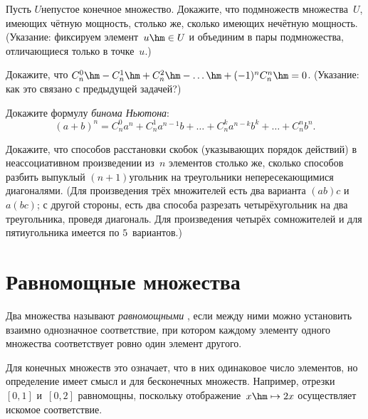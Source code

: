 \begin{problem}
Пусть $U$\т непустое конечное множество. Докажите, что
подмножеств множества~$U$, имеющих чётную мощность, столько же,
сколько имеющих нечётную мощность. (Указание: фиксируем
элемент~$u\hm\in U$ и объединим в пары подмножества, отличающиеся только
в точке~$u$.)
\end{problem}

\begin{problem}
Докажите, что $C_n^0\hm-C_n^1\hm+C_n^2\hm-\ldots\hm+(-1)^nC_n^n\hm=0$.
(Указание: как это связано с предыдущей задачей?)
\end{problem}

\begin{problem}
Докажите формулу \emph{бинома Ньютона}:
        $$
(a+b)^n= C_n^0 a^n + C_n^1 a^{n-1}b +
    \ldots+C_n^k a^{n-k}b^{k}+\ldots+C_n^n b^n.
        $$
\end{problem}

\begin{problem}
Докажите, что способов расстановки скобок (указывающих порядок
действий) в неассоциативном произведении из~$n$ элементов
столько же, сколько способов разбить выпуклый
$(n+1)$\д угольник на треугольники непересекающимися диагоналями.
(Для произведения трёх множителей есть два варианта $(ab)c$ и
$a(bc)$; с другой стороны, есть два способа разрезать
четырёхугольник на два треугольника, проведя диагональ. Для
произведения четырёх сомножителей и для пятиугольника имеется по
$5$~вариантов.)
\end{problem}

\section{Равномощные множества}
        \label{same-cardinality}

Два множества называют \emph{равномощными}%
, если между ними
можно установить взаимно однозначное соответствие, при котором
каждому элементу одного множества соответствует ровно один элемент
другого.

Для конечных множеств это означает, что в них одинаковое число
элементов, но определение имеет смысл и для бесконечных
множеств. Например, отрезки~$[0,1]$ и~$[0,2]$ равномощны,
поскольку отображение~$x\hm\mapsto 2x$ осуществляет искомое соответствие.

